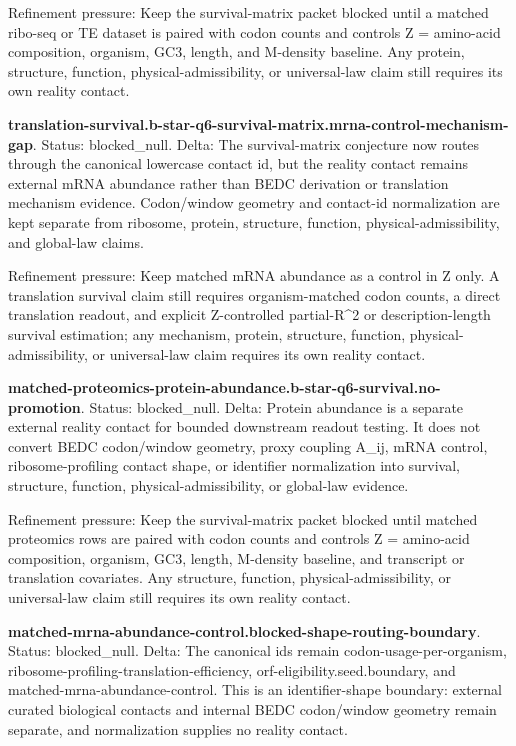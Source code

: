 Refinement pressure: Keep the survival-matrix packet blocked until a matched ribo-seq or TE dataset is paired with codon counts and controls Z = amino-acid composition, organism, GC3, length, and M-density baseline. Any protein, structure, function, physical-admissibility, or universal-law claim still requires its own reality contact.

\textbf{translation-survival.b-star-q6-survival-matrix.mrna-control-mechanism-gap}. Status: blocked\_null. Delta: The survival-matrix conjecture now routes through the canonical lowercase contact id, but the reality contact remains external mRNA abundance rather than BEDC derivation or translation mechanism evidence. Codon/window geometry and contact-id normalization are kept separate from ribosome, protein, structure, function, physical-admissibility, and global-law claims.

Refinement pressure: Keep matched mRNA abundance as a control in Z only. A translation survival claim still requires organism-matched codon counts, a direct translation readout, and explicit Z-controlled partial-R\textasciicircum{}2 or description-length survival estimation; any mechanism, protein, structure, function, physical-admissibility, or universal-law claim requires its own reality contact.

\textbf{matched-proteomics-protein-abundance.b-star-q6-survival.no-promotion}. Status: blocked\_null. Delta: Protein abundance is a separate external reality contact for bounded downstream readout testing. It does not convert BEDC codon/window geometry, proxy coupling A\_ij, mRNA control, ribosome-profiling contact shape, or identifier normalization into survival, structure, function, physical-admissibility, or global-law evidence.

Refinement pressure: Keep the survival-matrix packet blocked until matched proteomics rows are paired with codon counts and controls Z = amino-acid composition, organism, GC3, length, M-density baseline, and transcript or translation covariates. Any structure, function, physical-admissibility, or universal-law claim still requires its own reality contact.

\textbf{matched-mrna-abundance-control.blocked-shape-routing-boundary}. Status: blocked\_null. Delta: The canonical ids remain codon-usage-per-organism, ribosome-profiling-translation-efficiency, orf-eligibility.seed.boundary, and matched-mrna-abundance-control. This is an identifier-shape boundary: external curated biological contacts and internal BEDC codon/window geometry remain separate, and normalization supplies no reality contact.

